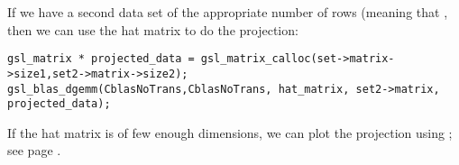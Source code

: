 If we have a second data set  of the appropriate number of
rows (meaning that , then we can use the hat matrix to do the projection:\\
\begin{lstlisting}
gsl_matrix * projected_data = gsl_matrix_calloc(set->matrix->size1,set2->matrix->size2);
gsl_blas_dgemm(CblasNoTrans,CblasNoTrans, hat_matrix, set2->matrix, projected_data);
\end{lstlisting}
If the hat matrix is of few enough dimensions, we can plot the
projection using ; see page \pageref{gnuprint}.

